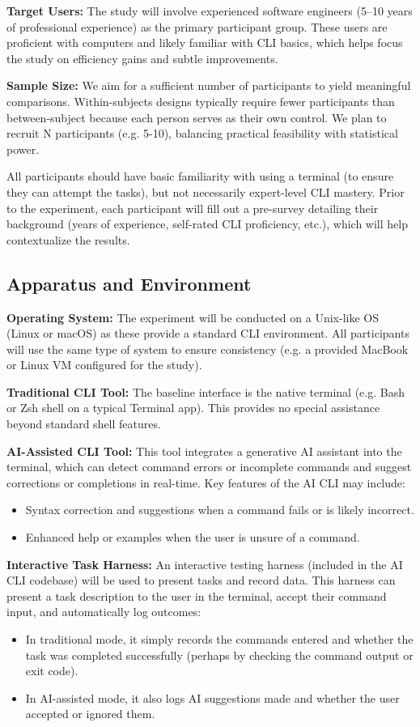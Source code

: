 \textbf{Target Users:} The study will involve experienced software engineers (5–10 years of professional experience) as the primary participant group. These users are proficient with computers and likely familiar with CLI basics, which helps focus the study on efficiency gains and subtle improvements.

\textbf{Sample Size:} We aim for a sufficient number of participants to yield meaningful comparisons. Within-subjects designs typically require fewer participants than between-subject because each person serves as their own control. We plan to recruit N participants (e.g. 5-10), balancing practical feasibility with statistical power.

All participants should have basic familiarity with using a terminal (to ensure they can attempt the tasks), but not necessarily expert-level CLI mastery. Prior to the experiment, each participant will fill out a pre-survey detailing their background (years of experience, self-rated CLI proficiency, etc.), which will help contextualize the results.

\subsection{Apparatus and Environment}

\textbf{Operating System:} The experiment will be conducted on a Unix-like OS (Linux or macOS) as these provide a standard CLI environment. All participants will use the same type of system to ensure consistency (e.g. a provided MacBook or Linux VM configured for the study).

\textbf{Traditional CLI Tool:} The baseline interface is the native terminal (e.g. Bash or Zsh shell on a typical Terminal app). This provides no special assistance beyond standard shell features.

\textbf{AI-Assisted CLI Tool:} This tool integrates a generative AI assistant into the terminal, which can detect command errors or incomplete commands and suggest corrections or completions in real-time. Key features of the AI CLI may include:
\begin{itemize}
	\item Syntax correction and suggestions when a command fails or is likely incorrect.
	\item Enhanced help or examples when the user is unsure of a command.
\end{itemize}

\textbf{Interactive Task Harness:} An interactive testing harness (included in the AI CLI codebase) will be used to present tasks and record data. This harness can present a task description to the user in the terminal, accept their command input, and automatically log outcomes:
\begin{itemize}
	\item In traditional mode, it simply records the commands entered and whether the task was completed successfully (perhaps by checking the command output or exit code).
	\item In AI-assisted mode, it also logs AI suggestions made and whether the user accepted or ignored them.
\end{itemize}

